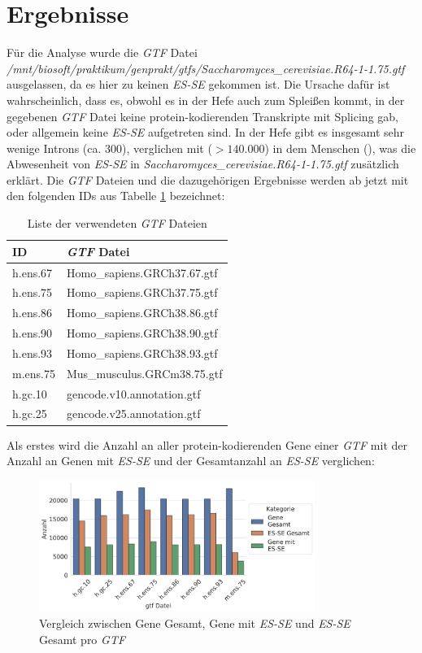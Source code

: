 \documentclass[12pt]{article}
\begin{document}
\section{Ergebnisse}\label{sec:res}
Für die Analyse wurde die \textit{GTF} Datei \textit{/mnt/biosoft/praktikum/genprakt/gtfs/Saccharomyces\_cerevisiae.R64-1-1.75.gtf} ausgelassen,
da es hier zu keinen \textit{ES-SE} gekommen ist. Die Ursache dafür ist wahrscheinlich, dass
es, obwohl es in der Hefe auch zum Splei\ss en kommt, in der gegebenen \textit{GTF} Datei keine protein-kodierenden Transkripte mit
Splicing gab, oder allgemein keine \textit{ES-SE} aufgetreten sind. 
In der Hefe gibt es insgesamt sehr wenige Introns (ca. 300), verglichen mit ($> 140.000$) in dem Menschen (\cite[p.~1525]{doi:10.1073/pnas.0610354104}),
was die Abwesenheit von \textit{ES-SE} in \textit{Saccharomyces\_cerevisiae.R64-1-1.75.gtf} zusätzlich erklärt. 
Die \textit{GTF} Dateien und die dazugehörigen Ergebnisse werden ab jetzt mit den folgenden IDs aus Tabelle 
\ref{tab:label} bezeichnet:

\begin{table}[htpb]
	\centering
	\caption{Liste der verwendeten \textit{GTF} Dateien}
	\label{tab:label}
	\begin{tabular}{l|l}
		\textbf{ID} & \textbf{\textit{GTF} Datei} \\ \hline
		h.ens.67    & Homo\_sapiens.GRCh37.67.gtf \\
		h.ens.75    & Homo\_sapiens.GRCh37.75.gtf \\
		h.ens.86    & Homo\_sapiens.GRCh38.86.gtf \\
		h.ens.90    & Homo\_sapiens.GRCh38.90.gtf \\
		h.ens.93    & Homo\_sapiens.GRCh38.93.gtf \\
		m.ens.75    & Mus\_musculus.GRCm38.75.gtf \\
		h.gc.10     & gencode.v10.annotation.gtf  \\
		h.gc.25     & gencode.v25.annotation.gtf  \\
	\end{tabular}
\end{table}


Als erstes wird die Anzahl an aller protein-kodierenden Gene einer \textit{GTF} mit der Anzahl an Genen mit \textit{ES-SE} und der Gesamtanzahl an \textit{ES-SE}
verglichen:

\begin{figure}[htpb]
	\centering
	\includegraphics[width=0.8\textwidth]{./plots/genes.jpg}
	\caption{Vergleich zwischen Gene Gesamt, Gene mit \textit{ES-SE} und \textit{ES-SE} Gesamt pro \textit{GTF}}
	\label{fig:-plots-genes-jpg}
\end{figure}
\end{document}
